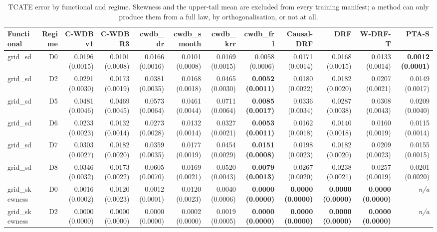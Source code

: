 \begin{table}[htbp]
\centering
\caption{TCATE error by functional and regime. Skewness and the upper-tail mean are excluded from every training manifest; a method can only produce them from a full law, by orthogonalisation, or not at all.}
\label{tab:p6-trackA-tcate}
\small
\begin{tabular}{@{}lrrrrrrrrrrr@{}}
\toprule
Functional & Regime & C-WDB v1 & C-WDB R3 & cwdb\_dr & cwdb\_smooth & cwdb\_krr & cwdb\_frl & Causal-DRF & DRF & W-DRF-T & PTA-S \\ 
\midrule
grid\_sd & D0 & 0.0196 (0.0015) & 0.0101 (0.0008) & 0.0166 (0.0016) & 0.0101 (0.0008) & 0.0169 (0.0015) & 0.0058 (0.0006) & 0.0171 (0.0014) & 0.0168 (0.0015) & 0.0133 (0.0014) & \textbf{0.0012 (0.0001)} \\ 
grid\_sd & D2 & 0.0291 (0.0030) & 0.0173 (0.0019) & 0.0381 (0.0035) & 0.0168 (0.0018) & 0.0465 (0.0030) & \textbf{0.0052 (0.0011)} & 0.0180 (0.0022) & 0.0182 (0.0020) & 0.0207 (0.0021) & 0.0149 (0.0017) \\ 
grid\_sd & D5 & 0.0481 (0.0046) & 0.0469 (0.0045) & 0.0573 (0.0064) & 0.0461 (0.0044) & 0.0711 (0.0064) & \textbf{0.0085 (0.0017)} & 0.0336 (0.0034) & 0.0287 (0.0038) & 0.0308 (0.0043) & 0.0209 (0.0040) \\ 
grid\_sd & D6 & 0.0233 (0.0023) & 0.0132 (0.0014) & 0.0273 (0.0028) & 0.0132 (0.0014) & 0.0327 (0.0021) & \textbf{0.0053 (0.0011)} & 0.0162 (0.0018) & 0.0140 (0.0018) & 0.0160 (0.0019) & 0.0115 (0.0014) \\ 
grid\_sd & D7 & 0.0303 (0.0027) & 0.0182 (0.0020) & 0.0359 (0.0035) & 0.0177 (0.0019) & 0.0454 (0.0029) & \textbf{0.0151 (0.0008)} & 0.0198 (0.0023) & 0.0182 (0.0020) & 0.0209 (0.0023) & 0.0155 (0.0015) \\ 
grid\_sd & D8 & 0.0346 (0.0032) & 0.0173 (0.0022) & 0.0605 (0.0070) & 0.0169 (0.0021) & 0.0520 (0.0043) & \textbf{0.0079 (0.0013)} & 0.0267 (0.0020) & 0.0238 (0.0021) & 0.0257 (0.0019) & 0.0201 (0.0020) \\ 
grid\_skewness & D0 & 0.0016 (0.0002) & 0.0120 (0.0023) & 0.0012 (0.0001) & 0.0120 (0.0023) & 0.0040 (0.0006) & \textbf{0.0000 (0.0000)} & \textbf{0.0000 (0.0000)} & \textbf{0.0000 (0.0000)} & \textbf{0.0000 (0.0000)} & \emph{n/a} \\ 
grid\_skewness & D2 & 0.0000 (0.0000) & 0.0000 (0.0000) & 0.0000 (0.0000) & 0.0002 (0.0000) & 0.0019 (0.0005) & \textbf{0.0000 (0.0000)} & \textbf{0.0000 (0.0000)} & \textbf{0.0000 (0.0000)} & \textbf{0.0000 (0.0000)} & \emph{n/a} \\ 

\end{tabular}
\end{table}
